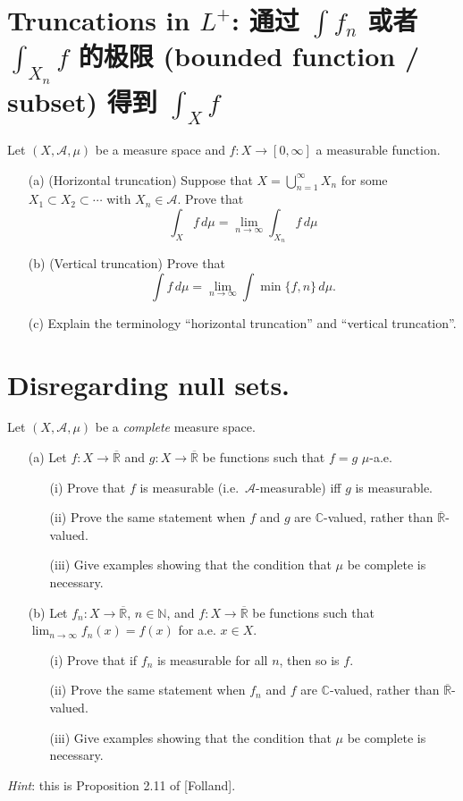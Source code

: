 \documentclass[lang=cn,11pt]{elegantbook}
\begin{document}
\section{Truncations in $L^+$: 通过 $\int f_n$ 或者 $\int_{X_n} f$ 的极限 (bounded function / subset) 得到 $\int_X f$}
Let $(X,\mathcal{A},\mu)$ be a measure space and $f\colon X\to [0, \infty]$ a measurable function.
\begin{itemize}
\item[(a)] (Horizontal truncation) Suppose that $X=\bigcup_{n=1}^\infty X_n$ for some $X_1\subset X_2\subset \cdots$ 
with $X_n\in \mathcal{A}$. Prove that 
\[
  \int_X f \,d\mu = \lim_{n\to \infty} \int_{X_n} f\,d\mu
\]
\item[(b)] (Vertical truncation)
  Prove that
\[
  \int f\,d\mu = \lim_{n\to \infty} \int \min\{ f,  n\}\,d\mu.
\]
\item[(c)]
  Explain the terminology ``horizontal truncation'' and ``vertical truncation''.
\end{itemize}

\section{Disregarding null sets.}
  Let $(X,\mathcal{A},\mu)$ be a \emph{complete} measure space.
  \begin{itemize}
  \item[(a)]
    Let $f\colon X\to \overline{\mathbb{R}}$ and $g\colon X\to \overline{\mathbb{R}}$ be functions such that $f=g$ $\mu$-a.e.
    \begin{itemize}
    \item[(i)]
      Prove that $f$ is measurable (i.e.\ $\mathcal{A}$-measurable) iff $g$ is measurable.
    \item[(ii)]
      Prove the same statement when $f$ and $g$ are $\mathbb{C}$-valued, rather than
      $\overline{\mathbb{R}}$-valued.
    \item[(iii)]
      Give examples showing that the condition that $\mu$ be complete is necessary.
    \end{itemize}
  \item[(b)]
    Let $f_n : X \to  \overline{\mathbb{R}}$, $n\in\mathbb{N}$, and $f\colon X\to \overline{\mathbb{R}}$ be functions such that $\lim_{n\to\infty}f_n(x)=f(x)$ for a.e. $x\in X$. 
    \begin{itemize}
    \item[(i)]
      Prove that if $f_n$ is measurable for all $n$, then so is $f$.
    \item[(ii)]
      Prove the same statement when $f_n$ and $f$ are $\mathbb{C}$-valued, rather than
      $\overline{\mathbb{R}}$-valued.
    \item[(iii)]
      Give examples showing that the condition that $\mu$ be complete is necessary.
    \end{itemize}
  \end{itemize}
  \textit{Hint}: this is Proposition 2.11 of [Folland].
  
\end{document}

